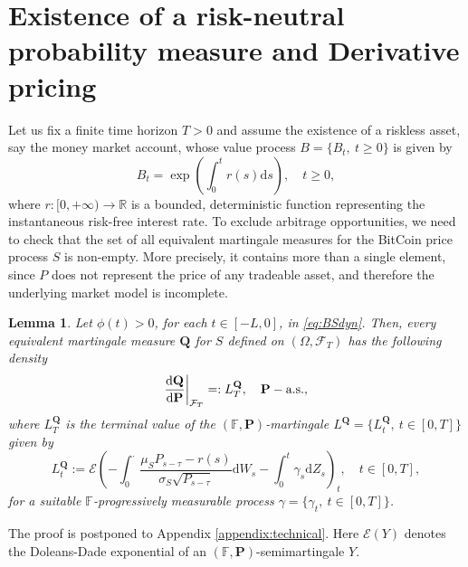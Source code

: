 \documentclass[12pt,centertags,reqno]{amsart}
\numberwithin{equation}{section} \makeatletter
\newtheorem{lemma}[theorem]{Lemma}
\def \F {\mathcal F}
\def \P {\mathbf P}
\def \Q {\mathbf Q}
\def \R {\mathbb R}
\def \E {\mathcal E}
\def \bF {\mathbb F}
\newcommand{\ud}{\mathrm d}
\newcommand{\doleans}[1] {\mathcal E\left(#1\right)}
\begin{document}
\section{Existence of a risk-neutral probability measure and Derivative pricing}
Let us fix a finite time horizon $T>0$ 
and assume the existence of a riskless asset, say the money market account, whose value process $B=\{B_t,\ t \geq 0\}$ %
is given by
$$
B_t=\exp{\left(\int_0^t r(s)\ud s\right)},\quad t \geq 0,
$$
where $r:[0,+\infty) \to \R$ is a bounded, deterministic function %
representing the instantaneous risk-free interest rate.
To exclude arbitrage opportunities, we %
need to check that the set of all equivalent martingale measures for the BitCoin price process $S$ is non-empty. More precisely, it contains more than a single element, since $P$ does not represent the price of any tradeable asset, and therefore the underlying market model is incomplete.
\begin{lemma}\label{lem:measure}
Let $\phi(t) > 0$, for each $t \in [-L,0]$, in \eqref{eq:BSdyn}. Then, every equivalent %
martingale measure $\Q$ for $S$ defined on $(\Omega,\F_T)$ has the following density 
\begin{equation}\label{def:Q}
\frac{\ud \Q}{\ud \P}\bigg{|}_{\F_T}=:L_T^\Q, \quad \P-\mbox{a.s.},
\end{equation} 
where $L_T^\Q$ is the terminal value of the $(\bF,\P)$-martingale $L^\Q=\{L_t^\Q,\ t \in [0,T]\}$ given by
\begin{equation} \label{eq:L}
L_t^\Q :=\doleans{-\int_0^\cdot \frac{\mu_S P_{s-\tau}-r(s)}{\sigma_S\sqrt{P_{s-\tau}}} \ud W_s - \int_0^t\gamma_s\ud Z_s}_t, \quad t \in [0,T], 
\end{equation}
for a suitable $\bF$-progressively measurable process $\gamma=\{\gamma_t,\ t \in [0,T]\}$.
\end{lemma}
The proof is postponed to Appendix \ref{appendix:technical}. Here $\E (Y)$ denotes the Doleans-Dade exponential of an $(\bF, \P)$-semimartingale $Y$.
\end{document}
